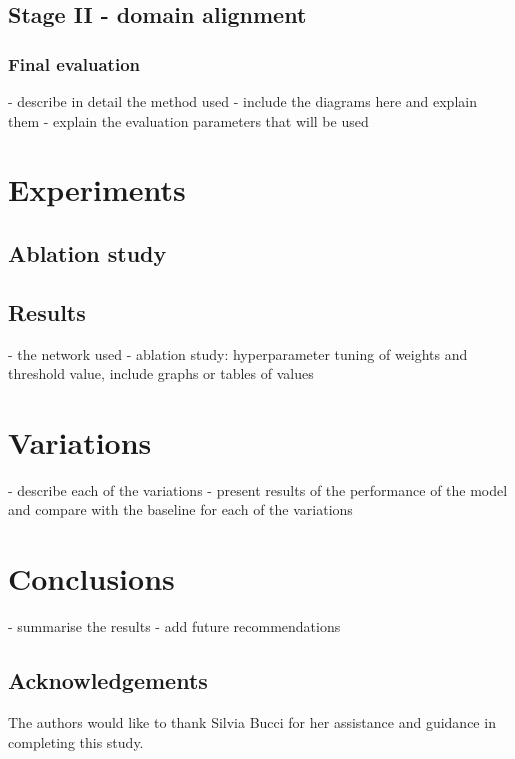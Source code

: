 \documentclass[10pt,twocolumn,letterpaper]{article}
\begin{document}
\subsection{Stage II - domain alignment}

\subsubsection*{Final evaluation}

- describe in detail the method used
- include the diagrams here and explain them
- explain the evaluation parameters that will be used

\section{Experiments}
\label{sec:experiments}

\subsection{Ablation study}
\label{sec:ablation}

\subsection{Results}

- the network used
- ablation study: hyperparameter tuning of weights and threshold value, include graphs or tables of values


\section{Variations}
\label{sec:variations}

- describe each of the variations
- present results of the performance of the model and compare with the baseline for each of the variations

\section{Conclusions}
\label{sec:conclusion}

- summarise the results
- add future recommendations

\subsection{Acknowledgements}
The authors would like to thank Silvia Bucci for her assistance and guidance in completing this study.


{\small


}
\end{document}
